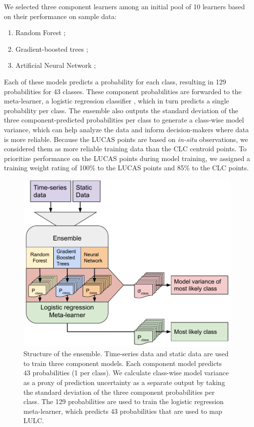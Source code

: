     We selected three component learners among an initial pool of 10 learners based on their performance on sample data:

    \begin{enumerate}
    \item Random Forest \citep{breiman2001random};
    \item Gradient-boosted trees \citep{chen2016xgboost};
    \item Artificial Neural Network \citep{mcculloch1943logical};
    \end{enumerate}

    Each of these models predicts a probability for each class, resulting in 129 probabilities for 43 classes. These component probabilities are forwarded to the meta-learner, a logistic regression classifier \citep{defazio2014saga}, which in turn predicts a single probability per class. The ensemble also outputs the standard deviation of the three component-predicted probabilities per class to generate a class-wise model variance, which can help analyze the data and inform decision-makers where data is more reliable. Because the LUCAS points are based on \emph{in-situ} observations, we considered them as more reliable training data than the CLC centroid points. To prioritize performance on the LUCAS points during model training, we assigned a training weight rating of 100\% to the LUCAS points and 85\% to the CLC points.
    
    \begin{figure}[!hbt]
    \centering
    \includegraphics{figs_03/methods_ensemble_structure.pdf}
    \caption{Structure of the ensemble. Time-series data and static data are used to train three component models. Each component model predicts 43 probabilities (1 per class). We calculate class-wise model variance as a proxy of prediction uncertainty as a separate output by taking the standard deviation of the three component probabilities per class. The 129 probabilities are used to train the logistic regression meta-learner, which predicts 43 probabilities that are used to map LULC.}
    \label{fig:ensemble_structure}
    \end{figure}
        
